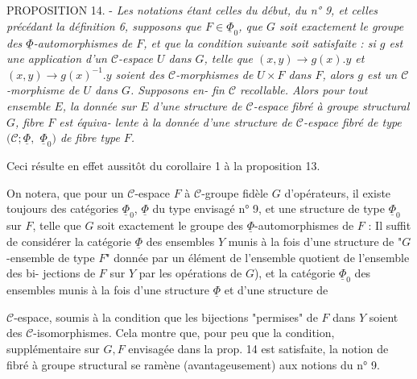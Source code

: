 PROPOSITION 14. - \emph{Les notations étant celles du début, du n° 9, et celles
précédant la définition 6, supposons que $F \in \underline{\Phi}_0$, que $G$ soit exactement
le groupe des $\underline{\Phi}$-automorphismes de $F$, et que la condition suivante
soit satisfaite : si $g$ est une application d'un $\mathcal{C}$-espace $U$ dans $G$,
telle que $(x,y) \to g(x).y$ et $(x,y) \to g(x)^{-1}.y$ soient des $\mathcal{C}$-morphismes
de $U \times F$ dans $F$, alors $g$ est un $\mathcal{C}$-morphisme de $U$ dans $G$. Supposons en-
fin $\mathcal{C}$ recollable. Alors pour tout ensemble $E$, la donnée sur $E$ d'une
structure de $\mathcal{C}$-espace fibré à groupe structural $G$, fibre $F$ est équiva-
lente à la donnée d'une structure de $\mathcal{C}$-espace fibré de type $(\mathcal{C}; \underline{\Phi}, $
$\underline{\Phi}_0)$ de fibre type $F$.}

Ceci résulte en effet aussitôt du corollaire 1 à la proposition 13.

On notera, que pour un $\mathcal{C}$-espace $F$ à $\mathcal{C}$-groupe fidèle $G$ d'opérateurs,
il existe toujours des catégories $\underline{\Phi}_0$, $\underline{\Phi}$ du type envisagé n° 9, et
une structure de type $\underline{\Phi}_0$ sur $F$, telle que $G$ soit exactement le groupe
des $\underline{\Phi}$-automorphismes de $F$ : Il suffit de considérer la catégorie $\underline{\Phi}$
des ensembles $Y$ munis à la fois d'une structure de "$G$-ensemble de type
$F$" donnée par un élément de l'ensemble quotient de l'ensemble des bi-
jections de $F$ sur $Y$ par les opérations de $G$), et la catégorie $\underline{\Phi}_0$ des
ensembles munis à la fois d'une structure $\underline{\Phi}$ et d'une structure de

\newpage



$\mathcal{C}$-espace, soumis à la condition que les bijections "permises" de $F$ dans $Y$ soient des $\mathcal{C}$-isomorphismes. Cela montre que, pour peu que la condition, supplémentaire sur $G,F$ envisagée dans la prop. 14 est satisfaite, la notion de fibré à groupe structural se ramène (avantageusement) aux notions du n° 9.

